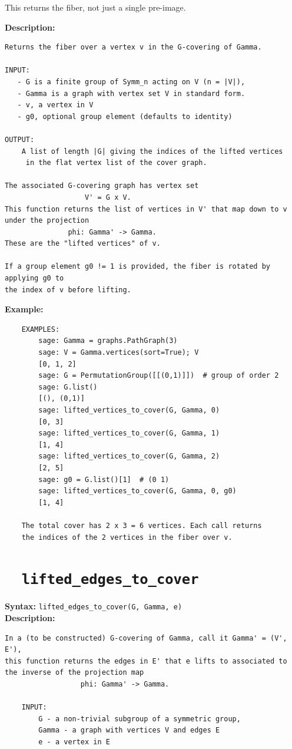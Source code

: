 \documentclass{article}
\begin{document}
This returns the fiber, not just a single pre-image.

\textbf{Description:}
\begin{verbatim}
Returns the fiber over a vertex v in the G-covering of Gamma.

INPUT:
   - G is a finite group of Symm_n acting on V (n = |V|),
   - Gamma is a graph with vertex set V in standard form.
   - v, a vertex in V
   - g0, optional group element (defaults to identity)

OUTPUT:
    A list of length |G| giving the indices of the lifted vertices
     in the flat vertex list of the cover graph.

The associated G-covering graph has vertex set 
                   V' = G x V. 
This function returns the list of vertices in V' that map down to v under the projection 
               phi: Gamma' -> Gamma. 
These are the "lifted vertices" of v.

If a group element g0 != 1 is provided, the fiber is rotated by applying g0 to 
the index of v before lifting.

\end{verbatim}

\textbf{Example:}
\begin{verbatim}
    EXAMPLES:
        sage: Gamma = graphs.PathGraph(3)
        sage: V = Gamma.vertices(sort=True); V
        [0, 1, 2]
        sage: G = PermutationGroup([[(0,1)]])  # group of order 2
        sage: G.list()
        [(), (0,1)]
        sage: lifted_vertices_to_cover(G, Gamma, 0)
        [0, 3]
        sage: lifted_vertices_to_cover(G, Gamma, 1)
        [1, 4]
        sage: lifted_vertices_to_cover(G, Gamma, 2)
        [2, 5]
        sage: g0 = G.list()[1]  # (0 1)
        sage: lifted_vertices_to_cover(G, Gamma, 0, g0)
        [1, 4]

    The total cover has 2 x 3 = 6 vertices. Each call returns
    the indices of the 2 vertices in the fiber over v.
\end{verbatim}

\section{\tt \ \ lifted\_edges\_to\_cover}

\textbf{Syntax:} \verb}lifted_edges_to_cover(G, Gamma, e)}\\

\textbf{Description:}
\begin{verbatim}
In a (to be constructed) G-covering of Gamma, call it Gamma' = (V', E'), 
this function returns the edges in E' that e lifts to associated to
the inverse of the projection map
                  phi: Gamma' -> Gamma.

    INPUT:
        G - a non-trivial subgroup of a symmetric group,
        Gamma - a graph with vertices V and edges E
        e - a vertex in E
\end{verbatim}
\end{document}
